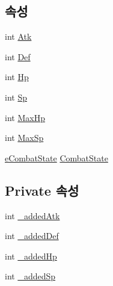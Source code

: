 \subsection*{속성}
\begin{DoxyCompactItemize}
\item 
int \hyperlink{class_combat_added_deco_aeb5992435525404a992ee9f028a2cf0d}{Atk}
\item 
int \hyperlink{class_combat_added_deco_ac3d7d042df2e8c8cbec3d6cbcb85ae96}{Def}
\item 
int \hyperlink{class_combat_added_deco_a6810b0a4d852d7f8dc61145e2c7c9fc4}{Hp}
\item 
int \hyperlink{class_combat_added_deco_aac41784d0f685c5db6107affca78d089}{Sp}
\item 
int \hyperlink{class_combat_added_deco_a6e24be83c5d6b04b0d900103bb398d2e}{Max\+Hp}
\item 
int \hyperlink{class_combat_added_deco_aa1dde14484472ac5d8b42d3ee9b745f2}{Max\+Sp}
\item 
\hyperlink{_combat_object_8cs_ae6d9f4a8ae9fffcdf1a546168a44f917}{e\+Combat\+State} \hyperlink{class_combat_added_deco_a16e7a3ae7dc8751d25ef0b6ee0ce5531}{Combat\+State}
\end{DoxyCompactItemize}
\subsection*{Private 속성}
\begin{DoxyCompactItemize}
\item 
int \hyperlink{class_combat_added_deco_ae3e4d0cbbf900b51cadf756154b9cd80}{\+\_\+added\+Atk}
\item 
int \hyperlink{class_combat_added_deco_abb40c78d41f1f133a285415b70506940}{\+\_\+added\+Def}
\item 
int \hyperlink{class_combat_added_deco_aa6d7287956c39e242ed254faf29e6a3b}{\+\_\+added\+Hp}
\item 
int \hyperlink{class_combat_added_deco_a02d5c40dcf180b1ad7086856dfa83929}{\+\_\+added\+Sp}
\end{DoxyCompactItemize}


